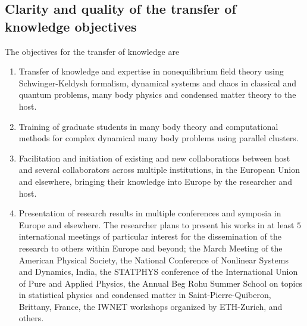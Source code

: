 \documentclass[a4paper,11pt,color]{article}
\begin{document}
\subsection{Clarity and quality of the transfer of knowledge objectives}
\label{sec:training_objectives}
The objectives for the transfer of knowledge are
\begin{enumerate}
 \item 
 Transfer of knowledge and expertise in nonequilibrium field theory using Schwinger-Keldysh formalism, dynamical systems and chaos in classical and quantum problems, many body physics and condensed matter theory to the host.
 \item
 Training of graduate students in many body theory and computational methods for complex dynamical many body problems using parallel clusters.
 \item
 Facilitation and initiation of existing and new collaborations between host and several collaborators across multiple institutions, in the European Union and elsewhere, bringing their knowledge into Europe by the researcher and host.
 \item
 Presentation of research results in multiple conferences and symposia in Europe and elsewhere. The researcher plans to present his works in at least $5$ international meetings of particular interest for the dissemination of the research to others within Europe and beyond; the March Meeting of the American Physical Society, the National Conference of Nonlinear Systems and Dynamics, India, the STATPHYS conference of the  International Union of Pure and Applied Physics, the Annual Beg Rohu Summer School on topics in statistical physics and condensed matter in Saint-Pierre-Quiberon, Brittany, France, the IWNET workshops organized by ETH-Zurich, and others.
\end{enumerate}
\end{document}
